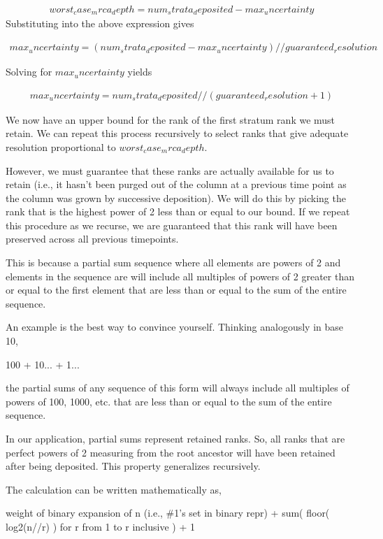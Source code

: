 \begin{align*}
   worst_case_mrca_depth = num_strata_deposited - max_uncertainty
\end{align*}
Substituting into the above expression gives

\begin{align*}
   max_uncertainty
   = (num_strata_deposited - max_uncertainty) // guaranteed_resolution
\end{align*}

Solving for $max_uncertainty$ yields

\begin{align*}
  max_uncertainty
  = num_strata_deposited // (guaranteed_resolution + 1)
\end{align*}

We now have an upper bound for the rank of the first stratum rank
we must retain. We can repeat this process recursively to select
ranks that give adequate resolution proportional to
$worst_case_mrca_depth$.

However, we must guarantee that these ranks are actually available for
us to retain (i.e., it hasn't been purged out of the column at a
previous time point as the column was grown by successive deposition).
We will do this by picking the rank that is the highest power of 2
less than or equal to our bound. If we repeat this procedure as we
recurse, we are guaranteed that this rank will have been preserved
across all previous timepoints.

This is because a partial sum sequence where all elements are powers
of 2 and elements in the sequence are will include all multiples of
powers of 2 greater than or equal to the first element that are less
than or equal to the sum of the entire
sequence.

An example is the best way to convince yourself. Thinking analogously
in base 10,

   100 + 10... + 1...

the partial sums of any sequence of this form will always include all
multiples of powers of 100, 1000, etc. that are less than or equal to
the sum of the entire sequence.

In our application, partial sums represent retained ranks. So, all
ranks that are perfect powers of 2 measuring from the root ancestor
will have been retained after being deposited. This property
generalizes recursively.

The calculation can be written mathematically as,

  weight of binary expansion of n (i.e., \#1's set in binary repr)
  + sum(
      floor( log2(n//r) )
      for r from 1 to r inclusive
  )
  + 1

